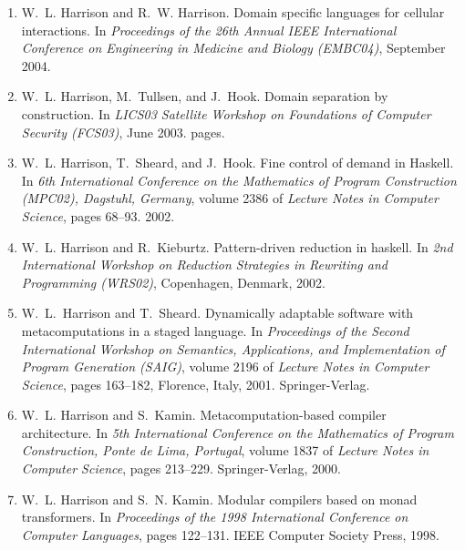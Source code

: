 \documentclass[12pt]{article} %
\begin{document}
\begin{enumerate}[leftmargin=0.0mm]
\item
W.~L. Harrison and R.~W. Harrison.
\newblock Domain specific languages for cellular interactions.
\newblock In {\em Proceedings of the 26th Annual IEEE International Conference
  on Engineering in Medicine and Biology (EMBC04)}, September 2004.

\item
W.~L. Harrison, M.~Tullsen, and J.~Hook.
\newblock Domain separation by construction.
\newblock In {\em LICS03 Satellite Workshop on Foundations of Computer Security
  (FCS03)}, June 2003.
 pages.

\item
W.~L. Harrison, T.~Sheard, and J.~Hook.
\newblock Fine control of demand in {Haskell}.
\newblock In {\em 6th International Conference on the Mathematics of Program
  Construction (MPC02), Dagstuhl, Germany}, volume 2386 of {\em Lecture Notes in Computer Science}, pages 68--93. 2002.

\item
W.~L. Harrison and R.~Kieburtz.
\newblock Pattern-driven reduction in haskell.
\newblock In {\em 2nd International Workshop on Reduction Strategies in
  Rewriting and Programming (WRS02)}, Copenhagen, Denmark, 2002.



\item
W.~L.~Harrison and T.~Sheard.
\newblock Dynamically adaptable software with metacomputations in a staged
  language.
\newblock In {\em Proceedings of the Second International Workshop on
  Semantics, Applications, and Implementation of Program Generation (SAIG)},
  volume 2196 of {\em Lecture Notes in Computer Science}, pages 163--182,
  Florence, Italy, 2001. Springer-Verlag.


\item
W.~L. Harrison and S.~Kamin.
\newblock Metacomputation-based compiler architecture.
\newblock In {\em 5th International Conference on the Mathematics of Program
  Construction, Ponte de Lima, Portugal}, volume 1837 of {\em Lecture Notes in
  Computer Science}, pages 213--229. Springer-Verlag, 2000.


\item
W.~L. Harrison and S.~N. Kamin.
\newblock Modular compilers based on monad transformers.
\newblock In {\em Proceedings of the 1998 International Conference on Computer
  Languages}, pages 122--131. IEEE Computer Society Press, 1998.



\end{enumerate}
\end{document}
